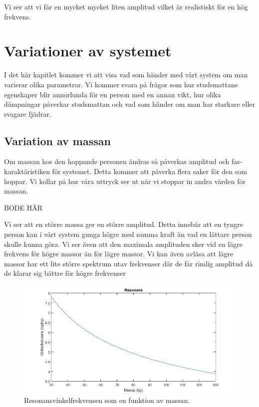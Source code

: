 \documentclass[10pt,a4paper]{article}
\begin{document}
Vi ser att vi får en mycket mycket liten amplitud vilket är realistiskt för en hög frekvens.




\newpage
\section{Variationer av systemet}

I det här kapitlet kommer vi att visa vad som händer med vårt system om man varierar olika parametrar. Vi kommer svara på frågor som hur studsmattans egenskaper blir annorlunda för en person med en annan vikt, hur olika dämpningar påverkar studsmattan och vad som händer om man har starkare eller svagare fjädrar.



\subsection{Variation av massan}

Om massan hos den hoppande personen ändras så påverkas amplitud och fas-karaktäristiken för systemet. Detta kommer att påverka flera saker för den som hoppar. Vi kollar på hur våra uttryck ser ut när vi stoppar in andra värden för massan. 

BODE HÄR

Vi ser att en större massa ger en större amplitud. Detta innebär att en tyngre person kan i vårt system gunga högre med samma kraft än vad en lättare person skulle kunna göra. Vi ser även att den maximala amplituden sker vid en lägre frekvens för högre massor än för lägre massor. Vi kan även avläsa att lägre massor har ett lite större spektrum utav frekvenser där de får rimlig amplitud då de klarar sig bättre för högre frekvenser

\begin{figure}[h]
\begin{center}
\includegraphics[scale=0.4]{resonans}
\caption{Resonansvinkelfrekvensen som en funktion av massan.}
\end{center}
\end{figure}
\end{document}
